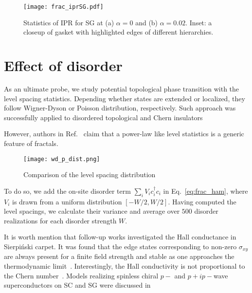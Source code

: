 \begin{figure}[h]
\centering
\texttt{[image: frac\_iprSG.pdf]}
\caption{Statistics of IPR for SG at (a) $\alpha = 0$ and (b) $\alpha = 0.02$. Inset: a closeup of gasket with highlighted edges of different hierarchies.}
\label{fig:IPR_SG}
\end{figure}


\section{Effect of disorder}

As an ultimate probe, we study potential topological phase transition with the level spacing statistics. Depending whether states are extended or localized, they follow Wigner-Dyson or Poisson distribution, respectively. Such approach was successfully applied to disordered topological and Chern insulators~\cite{2010:ProdanDisordCI, 2011:Prodan}


However, authors in Ref.~\cite{KatnelsonLevels2019} claim that a power-law like level statistics is a generic feature of fractals.

\begin{figure}
\centering
\texttt{[image: wd\_p\_dist.png]} 
\caption{Comparison of the level spacing distribution}
\label{fig:ls_distr}
\end{figure}


To do so, we add the on-site disorder term $\sum_i V_i c_i^{\dagger} c_i$ in Eq.~\eqref{eq:frac_ham}, where $V_i$ is drawn from a uniform distribution $[-W/2, W/2 ]$. Having computed the level spacings, we calculate their variance and average over $500$ disorder realizations for each disorder strength $W$.



It is worth mention that follow-up works investigated the Hall conductance in Sierpiński carpet. It was found that the edge states corresponding to non-zero $\sigma_{xy}$ are always present for a finite field strength and stable as one approaches the thermodynamic limit~\cite{EdgesFremling2020}. Interestingly, the Hall conductivity is not proportional to the Chern number~. Models realizing spinless chiral $p-$ and $p +ip-$wave superconductors on SC and SG were discussed in~\cite{PaiFractal2019}

